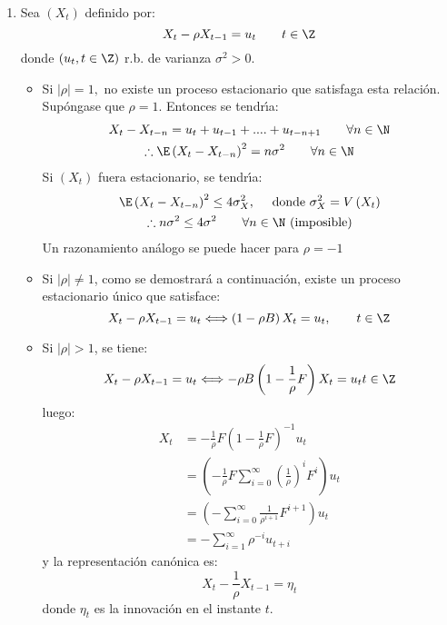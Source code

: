 \begin{ejemplo}
\begin{enumerate}
\begin{proof}[Resoluci\'{o}n]
\begin{enumerate}
Si $\varphi_{2} =$ -0,025, se obtiene la ecuaci\'{o}n asociada al 
polinomio autoregresivo.
\[
\varphi(z)=1-0,8z + 0,02z^{{2 }}\Leftrightarrow 
z_{{1}}=38,70 z_{{2}}=1,292
\]
Puesto que las dos ra\'{\i}ces son de $\left| \right|<1$, el proceso es 
estacionario. As\'{\i}, entonces, $\varphi_{2}= -0,025$.\qedhere
\end{enumerate} 
\end{proof}


\item Sea $\left( {X_{t} } \right)$ definido por:
\[
X_{t} -\rho X_{t-1} =u_{t} 
\qquad
t\in \Z
\]
donde $\left( {u_{t} ,t\in \Z} \right)$ r.b. de varianza $\sigma^{2}>0$.

\begin{itemize}
\item Si $\left| \rho \right|=1,$ no existe un proceso estacionario que satisfaga esta relaci\'{o}n. Sup\'{o}ngase que $\rho =1$. Entonces se tendr\'{\i}a:
\begin{gather*}
X_{t} -X_{t-n} =u_{t} +u_{t-1} +....+u_{t-n+1} \qquad\forall n\in \N\\
\therefore\E\left( {X_{t} -X_{t-n} } \right)^{2}=n\sigma^{2}\qquad\forall n\in \N
\end{gather*}
Si $\left( {X_{t} } \right)$ fuera estacionario, se tendr\'{\i}a:
\begin{gather*}
\E\left( {X_{t} -X_{t-n} } \right)^{2}\le 4\sigma_{X}^{2} ,\quad\text{ donde }\sigma 
_{X}^{2} =V\left( {X_{t} } \right) \\
\therefore n\sigma^{2}\le 4\sigma^{2} \qquad \forall n\in \N \text{ (imposible)}
\end{gather*}
Un razonamiento an\'{a}logo se puede hacer para $\rho =-1$

\item Si $\left| \rho \right|\ne 1$, como se demostrar\'{a} a continuaci\'{o}n, existe un proceso estacionario \'{u}nico que satisface:
\[
X_{t} -\rho X_{t-1} =u_{t} 
\Longleftrightarrow 
\left( {1-\rho B} \right)X_{t} =u_{t},
\qquad
t\in \Z
\]

\item Si $\left| \rho \right|>1$, se tiene:
\[
X_{t} -\rho X_{t-1} =u_{t} 
\Longleftrightarrow 
-\rho B\left( {1-\frac{1}{\rho }F} \right)X_{t} =u_{t} 
t\in \Z
\]
luego:
\begin{align*}
X_{t} 
	&=-\frac{1}{\rho }F\left( {1-\frac{1}{\rho }F} \right)^{-1}u_{t} \\
	&=\left( {-\frac{1}{\rho }F\sum_{i=0}^\infty {\left( {\frac{1}{\rho }} \right)^{i}F^{i}} } \right)u_{t}\\
	&=\left( {-\sum_{i=0}^\infty {\frac{1}{\rho^{i+1}}F^{i+1}} } \right)u_{t}  \\
	&=-\sum_{i=1}^\infty {\rho^{-i}u_{t+i} } 
\end{align*}
y la representaci\'{o}n can\'{o}nica es:
\[
X_{t} -\frac{1}{\rho }X_{t-1} =\eta_{t} 
\]
donde $\eta_{t} $ es la innovaci\'{o}n en el instante $t$.


\end{itemize}
\end{enumerate}
\end{ejemplo}

